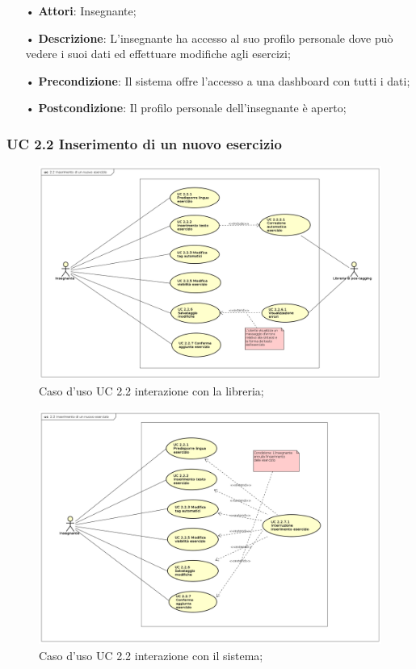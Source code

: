 \begin{itemize}
	\item[•] \textbf{Attori}: Insegnante;
	\item[•] \textbf{Descrizione}: L’insegnante ha accesso al suo profilo personale dove può vedere i suoi dati ed effettuare modifiche agli esercizi;

	\item[•] \textbf{Precondizione}: Il sistema offre l’accesso a una dashboard con tutti i dati;

	\item[•] \textbf{Postcondizione}:  Il profilo personale dell’insegnante è aperto;

\end{itemize}


\subsubsection{UC 2.2 Inserimento di un nuovo esercizio}

\begin{figure}[H]
	\centering
	\includegraphics[width=18cm]{img/UC22LIBRERIA.png} 
	\caption{Caso d'uso UC 2.2 interazione con la libreria;}
\end{figure}


\begin{figure}[H]
	\centering
	\includegraphics[width=18cm]{img/UC22SISTEMA.png} 
	\caption{Caso d'uso UC 2.2 interazione con il sistema;}
\end{figure}

